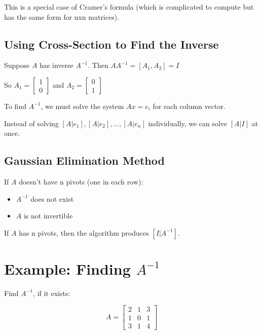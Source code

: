 \documentclass[12pt,a4paper]{article}
\begin{document}
This is a special case of Cramer's formula (which is complicated to compute but has the same form for nxn matrices).

\subsection{Using Cross-Section to Find the Inverse}

Suppose $A$ has inverse $A^{-1}$.
Then $AA^{-1} = [A_1, A_2] = I$

So $A_1 = \begin{bmatrix} 1 \\ 0 \end{bmatrix}$ and $A_2 = \begin{bmatrix} 0 \\ 1 \end{bmatrix}$

To find $A^{-1}$, we must solve the system $Ax = e_i$ for each column vector.

Instead of solving $[A|e_1], [A|e_2], \ldots, [A|e_n]$ individually, we can solve $[A|I]$ at once.

\subsection{Gaussian Elimination Method}

If $A$ doesn't have n pivots (one in each row):
\begin{itemize}
    \item $A^{-1}$ does not exist
    \item $A$ is not invertible
\end{itemize}

If $A$ has n pivots, then the algorithm produces $[I|A^{-1}]$.

\section{Example: Finding $A^{-1}$}

Find $A^{-1}$, if it exists:

\[A = \begin{bmatrix} 2 & 1 & 3 \\ 1 & 0 & 1 \\ 3 & 1 & 4 \end{bmatrix}\]
\end{document}
